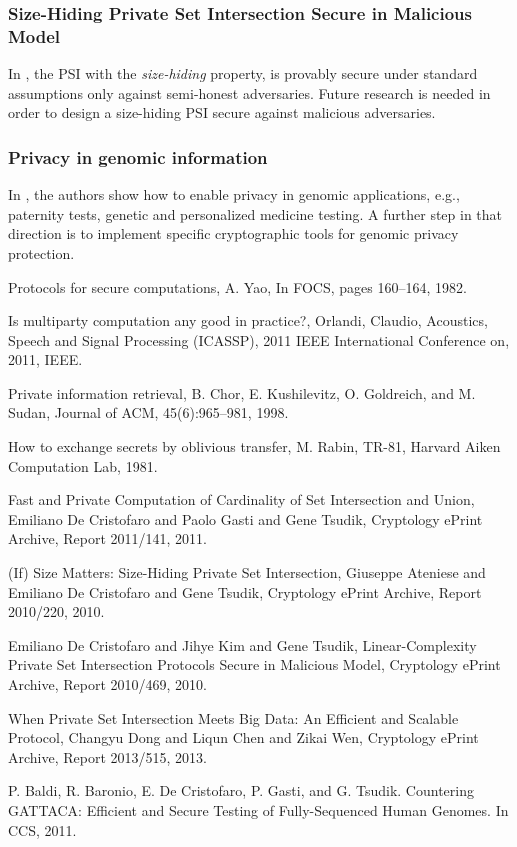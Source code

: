 \documentclass[dvips,12pt]{article}
\begin{document}
\subsubsection{Size-Hiding Private Set Intersection Secure in Malicious Model}
In \cite{size-psi}, the PSI with the \emph{size-hiding} property, is provably secure under standard assumptions only against semi-honest adversaries. Future research is needed in order to design a size-hiding PSI secure against malicious adversaries.  
\subsubsection{Privacy in genomic information}
In \cite{genome}, the authors show how to enable privacy in genomic applications, e.g., paternity tests, genetic and personalized medicine testing. A further step in that direction is to implement specific cryptographic tools for genomic privacy protection.
\begin{thebibliography}{99}
	Protocols for secure computations,
	A. Yao,
	In FOCS, pages 160–164, 1982.

  	Is multiparty computation any good in practice?,
  	Orlandi, Claudio,
  	{Acoustics, Speech and Signal Processing (ICASSP), 2011 IEEE International Conference on},
  	2011,
  	IEEE.

	Private information retrieval,
	B. Chor, E. Kushilevitz, O. Goldreich, and M. Sudan,
	Journal of ACM, 45(6):965–981, 1998.

	How to exchange secrets by oblivious transfer,
	M. Rabin,
	TR-81, Harvard Aiken Computation Lab, 1981.

	Fast and Private Computation of Cardinality of Set Intersection and Union, 
    Emiliano De Cristofaro and Paolo Gasti and Gene Tsudik,
    Cryptology ePrint Archive, Report 2011/141,
    2011.
    
    (If) Size Matters: Size-Hiding Private Set Intersection,
	Giuseppe Ateniese and Emiliano De Cristofaro and Gene Tsudik,
    Cryptology ePrint Archive, Report 2010/220,
	2010.

	Emiliano De Cristofaro and Jihye Kim and Gene Tsudik,	
	Linear-Complexity Private Set Intersection Protocols Secure in Malicious Model,
	Cryptology ePrint Archive, Report 2010/469,
	2010.

	When Private Set Intersection Meets Big Data: An Efficient and Scalable Protocol,
	Changyu Dong and Liqun Chen and Zikai Wen,
	Cryptology ePrint Archive, Report 2013/515,
	2013.
	
P. Baldi, R. Baronio, E. De Cristofaro, P. Gasti, and G. Tsudik. Countering GATTACA:
Efficient and Secure Testing of Fully-Sequenced Human Genomes. In CCS, 2011.

\end{thebibliography}
\end{document}
